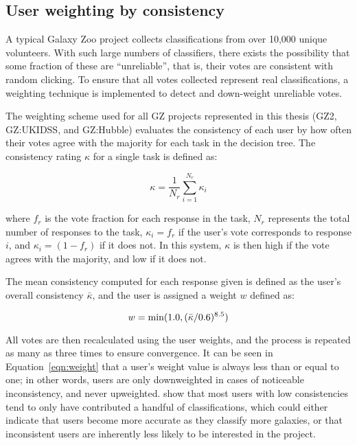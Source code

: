 \subsection{User weighting by consistency}
A typical Galaxy Zoo project collects classifications from over 10,000 unique volunteers. With such large numbers of classifiers, there exists the possibility that some fraction of these are ``unreliable'', that is, their votes are consistent with random clicking. To ensure that all votes collected represent real classifications, a weighting technique is implemented to detect and down-weight unreliable votes.

The weighting scheme used for all GZ projects represented in this thesis (GZ2, GZ:UKIDSS, and GZ:Hubble) evaluates the consistency of each user by how often their votes agree with the majority for each task in the decision tree. The consistency rating $\kappa$ for a single task is defined as:

\begin{equation}
\kappa = \frac{1}{N_{r}}\sum_{i=1}^{N_{r}}{\kappa_{i}}
\label{eqn:kappa}
\end{equation}

where $f_{r}$ is the vote fraction for each response in the task, $N_{r}$ represents the total number of responses to the task, $\kappa_{i} = f_{r}$ if the user's vote corresponds to response $i$, and $\kappa_{i} = (1-f_{r})$ if it does not. In this system, $\kappa$ is then high if the vote agrees with the majority, and low if it does not. 

The mean consistency computed for each response given is defined as the user's overall consistency $\bar{\kappa}$, and the user is assigned a weight $w$ defined as:

\begin{equation}
w = \rm min (1.0,(\bar{\kappa}/0.6)^{8.5})
\label{eqn:weight}
\end{equation}

All votes are then recalculated using the user weights, and the process is repeated as many as three times to ensure convergence. It can be seen in Equation~\ref{eqn:weight} that a user's weight value is always less than or equal to one; in other words, users are only downweighted in cases of noticeable inconsistency, and never upweighted. \citet{Willett2013} show that most users with low consistencies tend to only have contributed a handful of classifications, which could either indicate that users become more accurate as they classify more galaxies, or that inconsistent users are inherently less likely to be interested in the project. 

